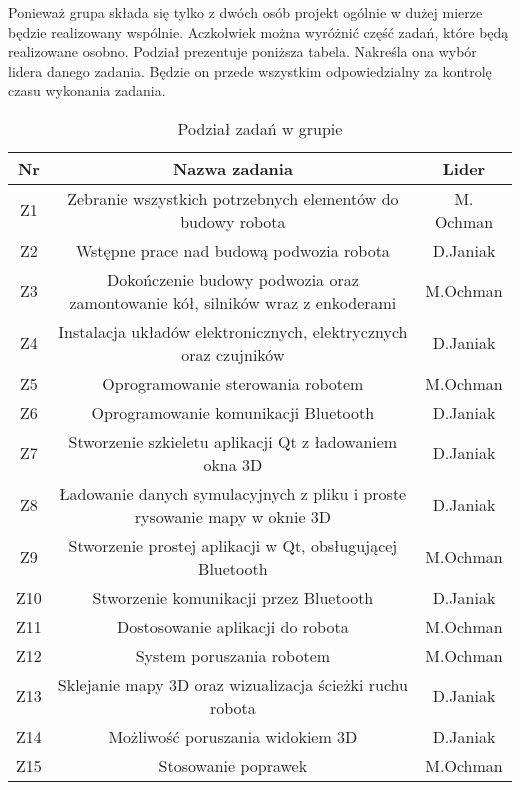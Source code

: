 Ponieważ grupa składa się tylko z dwóch osób projekt ogólnie w dużej mierze będzie realizowany wspólnie. Aczkolwiek można wyróżnić część zadań, które będą realizowane osobno. Podział prezentuje poniższa tabela. Nakreśla ona wybór lidera danego zadania. Będzie on przede wszystkim odpowiedzialny za kontrolę czasu wykonania zadania.



\begin{table}[!htbp]
\begin{center}
\begin{tabular}{|c|c|c|}

\hline
\textbf{Nr} & \textbf{Nazwa zadania} & \textbf{Lider} \\ \hline\hline
Z1 & Zebranie wszystkich potrzebnych elementów do budowy robota & M. Ochman \\ \hline
Z2 & Wstępne prace nad budową podwozia robota & D.Janiak \\ \hline
Z3 & Dokończenie budowy podwozia oraz zamontowanie kół, silników wraz z enkoderami & M.Ochman \\ \hline
Z4 & Instalacja układów elektronicznych, elektrycznych oraz czujników & D.Janiak \\ \hline
Z5 & Oprogramowanie sterowania robotem & M.Ochman \\ \hline
Z6 & Oprogramowanie komunikacji Bluetooth & D.Janiak \\ \hline
Z7 & Stworzenie szkieletu aplikacji Qt z ładowaniem okna 3D & D.Janiak \\ \hline
Z8 & Ładowanie danych symulacyjnych z pliku i proste rysowanie mapy w oknie 3D & D.Janiak \\ \hline
Z9 & Stworzenie prostej aplikacji w Qt, obsługującej Bluetooth & M.Ochman \\ \hline
Z10 & Stworzenie komunikacji przez Bluetooth & D.Janiak \\ \hline
Z11 & Dostosowanie aplikacji do robota & M.Ochman \\ \hline
Z12 & System poruszania robotem & M.Ochman \\ \hline
Z13 & Sklejanie mapy 3D oraz wizualizacja ścieżki ruchu robota & D.Janiak \\ \hline
Z14 & Możliwość poruszania widokiem 3D & D.Janiak \\ \hline
Z15 & Stosowanie poprawek & M.Ochman \\ \hline

\end{tabular}
\caption{Podział zadań w grupie}
\end{center}
\end{table}

